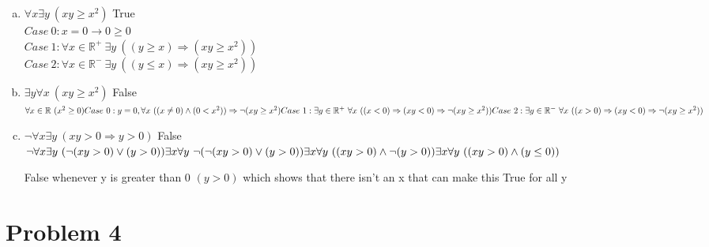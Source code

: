\documentclass[11pt,letterpaper]{article}
\begin{document}
\begin{enumerate}[(a)]
\item $\forall x \exists y ~(xy\geq x^2)$ True\\
$Case~0: x = 0 \rightarrow 0\geq 0$\\
$Case~1: \forall x\in \mathbb{R}^{+}~\exists y
~((y\geq x)\Rightarrow (xy\geq x^2))$\\
$Case~2: \forall x\in \mathbb{R}^{-}~\exists y
~((y\leq x)\Rightarrow (xy\geq x^2))$
\item $\exists y\forall x ~(xy\geq x^2)$ False\\
$\forall x\in\mathbb{R}~(x^2\geq 0)\\
Case~0: y=0,\forall x~((x\neq0)\wedge(0 < x^2))\Rightarrow\neg(xy\geq x^2)~ \\
Case~1: \exists y\in\mathbb{R}^+~\forall x\
((x<0)\Rightarrow (xy < 0)\Rightarrow\neg(xy\geq x^2))\\
Case~2: \exists y\in\mathbb{R}^-~\forall x\
((x>0)\Rightarrow (xy <0)\Rightarrow\neg(xy\geq x^2))\\$
\item $\neg\forall x\exists y~ (xy>0\Rightarrow y>0)$ False\\
$\neg\forall x\exists y~(\neg(xy>0)\vee(y>0))\\
\exists x\forall y~ \neg(\neg(xy>0)\vee(y>0))\\
\exists x\forall y~ ((xy>0)\wedge\neg(y>0))\\
\exists x\forall y~ ((xy>0)\wedge(y\leq0))\\$
\smallskip

False whenever y is greater than 0 $(y>0)$ which shows that there isn't an x that can make this True for all y

\end{enumerate}
\clearpage

\section*{Problem 4}
\end{document}
